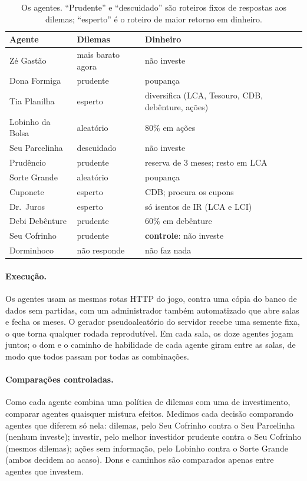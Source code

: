 \documentclass[11pt,a4paper]{article}
\begin{document}
\begin{table}[ht]
  \centering\small
  \caption{Os agentes. ``Prudente'' e ``descuidado'' são roteiros fixos de respostas aos dilemas; ``esperto'' é o roteiro de maior retorno em dinheiro.}
  \label{tab:agentes}
  \begin{tabularx}{\linewidth}{@{}l l X@{}}
    \toprule
    Agente & Dilemas & Dinheiro \\
    \midrule
    Zé Gastão & mais barato agora & não investe \\
    Dona Formiga & prudente & poupança \\
    Tia Planilha & esperto & diversifica (LCA, Tesouro, CDB, debênture, ações) \\
    Lobinho da Bolsa & aleatório & 80\% em ações \\
    Seu Parcelinha & descuidado & não investe \\
    Prudêncio & prudente & reserva de 3 meses; resto em LCA \\
    Sorte Grande & aleatório & poupança \\
    Cuponete & esperto & CDB; procura os cupons \\
    Dr.\ Juros & esperto & só isentos de IR (LCA e LCI) \\
    Debi Debênture & prudente & 60\% em debênture \\
    Seu Cofrinho & prudente & \textbf{controle}: não investe \\
    Dorminhoco & não responde & não faz nada \\
    \bottomrule
  \end{tabularx}
\end{table}

\paragraph{Execução.} Os agentes usam as mesmas rotas HTTP do jogo, contra uma cópia do banco de dados sem partidas, com um administrador também automatizado que abre salas e fecha os meses. O gerador pseudoaleatório do servidor recebe uma semente fixa, o que torna qualquer rodada reprodutível. Em cada sala, os doze agentes jogam juntos; o dom e o caminho de habilidade de cada agente giram entre as salas, de modo que todos passam por todas as combinações.

\paragraph{Comparações controladas.} Como cada agente combina uma política de dilemas com uma de investimento, comparar agentes quaisquer mistura efeitos. Medimos cada decisão comparando agentes que diferem só nela: dilemas, pelo Seu Cofrinho contra o Seu Parcelinha (nenhum investe); investir, pelo melhor investidor prudente contra o Seu Cofrinho (mesmos dilemas); ações sem informação, pelo Lobinho contra o Sorte Grande (ambos decidem ao acaso). Dons e caminhos são comparados apenas entre agentes que investem.
\end{document}
